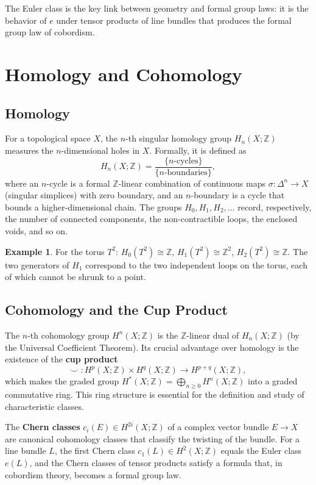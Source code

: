 \documentclass[12pt]{article}
\theoremstyle{definition}
\newtheorem{example}[theorem]{Example}
\theoremstyle{remark}
\newcommand{\Z}{\mathbb{Z}}
\begin{document}
The Euler class is the key link between geometry and formal group laws: it is the behavior of $e$ under tensor products of line bundles that produces the formal group law of cobordism.

\section{Homology and Cohomology}\label{sec:homology}

\subsection{Homology}

For a topological space $X$, the $n$-th singular homology group $H_n(X; \Z)$ measures the $n$-dimensional holes in $X$. Formally, it is defined as
\[
  H_n(X;\Z) = \frac{\{\text{$n$-cycles}\}}{\{\text{$n$-boundaries}\}},
\]
where an $n$-cycle is a formal $\Z$-linear combination of continuous maps $\sigma : \Delta^n \to X$ (singular simplices) with zero boundary, and an $n$-boundary is a cycle that bounds a higher-dimensional chain. The groups $H_0, H_1, H_2, \ldots$ record, respectively, the number of connected components, the non-contractible loops, the enclosed voids, and so on.

\begin{example}
For the torus $T^2$: $H_0(T^2) \cong \Z$, $H_1(T^2) \cong \Z^2$, $H_2(T^2) \cong \Z$. The two generators of $H_1$ correspond to the two independent loops on the torus, each of which cannot be shrunk to a point.
\end{example}

\subsection{Cohomology and the Cup Product}

The $n$-th cohomology group $H^n(X; \Z)$ is the $\Z$-linear dual of $H_n(X;\Z)$ (by the Universal Coefficient Theorem). Its crucial advantage over homology is the existence of the \textbf{cup product}
\[
  \smile \; : H^p(X;\Z) \times H^q(X;\Z) \longrightarrow H^{p+q}(X;\Z),
\]
which makes the graded group $H^*(X;\Z) = \bigoplus_{n \geq 0} H^n(X;\Z)$ into a graded commutative ring. This ring structure is essential for the definition and study of characteristic classes.

The \textbf{Chern classes} $c_i(E) \in H^{2i}(X;\Z)$ of a complex vector bundle $E \to X$ are canonical cohomology classes that classify the twisting of the bundle. For a line bundle $L$, the first Chern class $c_1(L) \in H^2(X;\Z)$ equals the Euler class $e(L)$, and the Chern classes of tensor products satisfy a formula that, in cobordism theory, becomes a formal group law.
\end{document}
